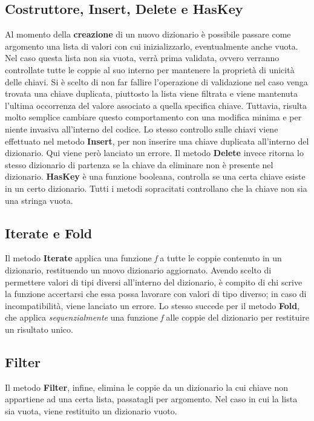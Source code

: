 \documentclass[10pt, italian, openany]{book}
\begin{document}
\subsection{Costruttore, Insert, Delete e HasKey}
Al momento della \textbf{creazione} di un nuovo dizionario è possibile passare come argomento una lista di valori con cui inizializzarlo, eventualmente anche vuota. Nel caso questa lista non sia vuota, verrà prima validata, ovvero verranno controllate tutte le coppie al suo interno per mantenere la proprietà di unicità delle chiavi. Si è scelto di non far fallire l'operazione di validazione nel caso venga trovata una chiave duplicata, piuttosto la lista viene filtrata e viene mantenuta l'ultima occorrenza del valore associato a quella specifica chiave. Tuttavia, risulta molto semplice cambiare questo comportamento con una modifica minima e per niente invasiva all'interno del codice.  Lo stesso controllo sulle chiavi viene effettuato nel metodo \textbf{Insert}, per non inserire una chiave duplicata all'interno del dizionario. Qui viene però lanciato un errore. Il metodo \textbf{Delete} invece ritorna lo stesso dizionario di partenza se la chiave da eliminare non è presente nel dizionario. \textbf{HasKey} è una funzione booleana, controlla se una certa chiave esiste in un certo dizionario. Tutti i metodi sopracitati controllano che la chiave non sia una stringa vuota.

\subsection{Iterate e Fold}
Il metodo \textbf{Iterate} applica una funzione \textit{f} a tutte le coppie contenuto in un dizionario, restituendo un nuovo dizionario aggiornato. Avendo scelto di permettere valori di tipi diversi all'interno del dizionario, è compito di chi scrive la funzione accertarsi che essa possa lavorare con valori di tipo diverso; in caso di incompatibilità, viene lanciato un errore. Lo stesso succede per il metodo \textbf{Fold}, che applica \textit{sequenzialmente} una funzione \textit{f} alle coppie del dizionario per restituire un risultato unico.

\subsection{Filter}
Il metodo \textbf{Filter}, infine, elimina le coppie da un dizionario la cui chiave non appartiene ad una certa lista, passatagli per argomento. Nel caso in cui la lista sia vuota, viene restituito un dizionario vuoto.
\end{document}
